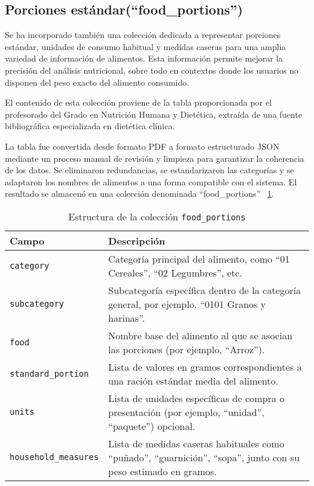 \subsection{Porciones estándar(``food\_portions'')}
Se ha incorporado también una colección dedicada a representar porciones estándar, unidades de consumo habitual y medidas caseras para una amplia variedad de información de alimentos. Esta información permite mejorar la precisión del análisis nutricional, sobre todo en contextos donde los usuarios no disponen del peso exacto del alimento consumido. 

El contenido de esta colección proviene de la tabla proporcionada por el profesorado del Grado en Nutrición Humana y Dietética, extraída de una fuente bibliográfica especializada en dietética clínica. \cite{Aparicio2015raciones}

La tabla fue convertida desde formato PDF a formato estructurado JSON mediante un proceso manual de revisión y limpieza para garantizar la coherencia de los datos. Se eliminaron redundancias, se estandarizaron las categorías y se adaptaron los nombres de alimentos a una forma compatible con el sistema. El resultado se almacenó en una colección denominada ``food\_portions'' ~\ref{tab:foodportions}.

\begin{table}[H]
    \centering
    \begin{tabular}{|l|p{8cm}|}
        \hline
        \textbf{Campo} & \textbf{Descripción} \\
        \hline
        \texttt{category} & Categoría principal del alimento, como “01 Cereales”, “02 Legumbres”, etc. \\
        \hline
        \texttt{subcategory} & Subcategoría específica dentro de la categoría general, por ejemplo, “0101 Granos y harinas”. \\
        \hline
        \texttt{food} & Nombre base del alimento al que se asocian las porciones (por ejemplo, “Arroz”). \\
        \hline
        \texttt{standard\_portion} & Lista de valores en gramos correspondientes a una ración estándar media del alimento. \\
        \hline
        \texttt{units} & Lista de unidades específicas de compra o presentación (por ejemplo, “unidad”, “paquete”) opcional. \\
        \hline
        \texttt{household\_measures} & Lista de medidas caseras habituales como “puñado”, “guarnición”, “sopa”, junto con su peso estimado en gramos. \\
        \hline
    \end{tabular}
    \caption{Estructura de la colección \texttt{food\_portions}}
    \label{tab:foodportions}
\end{table}

